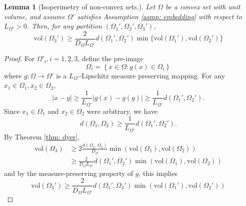 \documentclass{article}
\newcommand{\abs}[1]{\left \lvert #1 \right \rvert}
\newcommand{\vol}{\mathrm{vol}}
\newcommand{\set}[1]{\left\{#1\right\}}
\newcommand{\1}{\mathbf{1}}
\theoremstyle{alden}
\theoremstyle{aldenthm}
\newtheorem{lemma}{Lemma}
\theoremstyle{remark}
\begin{document}
\begin{lemma}[Isoperimetry of non-convex sets.]
	Let $\Omega$ be a convex set with unit volume, and assume $\Omega'$ satisfies Assumption \ref{asmp: embedding} with respect to $L_{\Omega'} > 0$. Then, for any partition $(\Omega_1', \Omega_2', \Omega_3')$, 
	\begin{equation*}
	\vol(\Omega_3') \geq \frac{2}{D_{\Omega} L_{\Omega'}} d(\Omega_1',\Omega_2') \min\{\vol(\Omega_1'), \vol(\Omega_2') \}
	\end{equation*}
\end{lemma}
\begin{proof}
	For $\Omega'_i, i = 1,2,3$, define the pre-image
	\begin{equation*}
	\Omega_i = \set{x \in \Omega: g(x) \in \Omega_i}
	\end{equation*}
	where $g: \Omega \to \Omega'$ is a $L_{\Omega'}$-Lipschitz measure preserving mapping. For any $x_1 \in \Omega_1, x_2 \in \Omega_2$, 
	\begin{equation*}
	\abs{x - y} \geq \frac{1}{L_{\Omega'}}\abs{g(x) - g(y)} \geq \frac{1}{L_{\Omega'}} d(\Omega_1', \Omega_2'). 
	\end{equation*}
	Since $x_1 \in \Omega_1$ and $x_2 \in \Omega_2$ were arbitrary, we have
	\begin{equation*}
	d(\Omega_1, \Omega_2) \geq \frac{1}{L_{\Omega'}} d(\Omega_1', \Omega_2').
	\end{equation*}
	By Theorem \ref{thm: dyer},
	\begin{align*}
	\vol(\Omega_3) & \geq 2\frac{d(\Omega_1, \Omega_2)}{D_{\Omega}} \min(\vol(\Omega_1), \vol(\Omega_2)) \\
	& \geq \frac{2}{D_{\Omega} L_{\Omega'}} d(\Omega_1', \Omega_2') \min(\vol(\Omega_1), \vol(\Omega_2))
	\end{align*}
	and by the measure-preserving property of $g$, this implies
	\begin{equation*}
	\vol(\Omega_3') \geq \frac{2}{D_{\Omega} L_{\Omega'}} d(\Omega_1', \Omega_2') \min(\vol(\Omega_1'), \vol(\Omega_2'))
	\end{equation*}
\end{proof}
\end{document}
